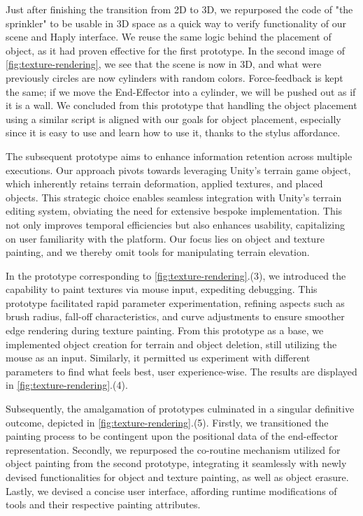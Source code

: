 Just after finishing the transition from 2D to 3D, we repurposed the code of "the sprinkler" to be usable in 3D space as a quick way to verify functionality of our scene and Haply interface.
We reuse the same logic behind the placement of object, as it had proven effective for the first prototype.
In the second image of \autoref{fig:texture-rendering}, we see that the scene is now in 3D, and what were previously circles are now cylinders with random colors.
Force-feedback is kept the same; if we move the End-Effector into a cylinder, we will be pushed out as if it is a wall.
We concluded from this prototype that handling the object placement using a similar script is aligned with our goals for object placement, especially since it is easy to use and learn how to use it, thanks to the stylus affordance. 

The subsequent prototype aims to enhance information retention across multiple executions. 
Our approach pivots towards leveraging Unity's terrain game object, which inherently retains terrain deformation, applied textures, and placed objects. 
This strategic choice enables seamless integration with Unity's terrain editing system, obviating the need for extensive bespoke implementation. 
This not only improves temporal efficiencies but also enhances usability, capitalizing on user familiarity with the platform. 
Our focus lies on object and texture painting, and we thereby omit tools for manipulating terrain elevation. 

In the prototype corresponding to \autoref{fig:texture-rendering}.(3), we introduced the capability to paint textures via mouse input, expediting debugging.
This prototype facilitated rapid parameter experimentation, refining aspects such as brush radius, fall-off characteristics, and curve adjustments to ensure smoother edge rendering during texture painting.
From this prototype as a base, we implemented object creation for terrain and object deletion, still utilizing the mouse as an input.
Similarly, it permitted us experiment with different parameters to find what feels best, user experience-wise. 
The results are displayed in \autoref{fig:texture-rendering}.(4).

Subsequently, the amalgamation of prototypes culminated in a singular definitive outcome, depicted in \autoref{fig:texture-rendering}.(5).
Firstly, we transitioned the painting process to be contingent upon the positional data of the end-effector representation. 
Secondly, we repurposed the co-routine mechanism utilized for object painting from the second prototype, integrating it seamlessly with newly devised functionalities for object and texture painting, as well as object erasure. 
Lastly, we devised a concise user interface, affording runtime modifications of tools and their respective painting attributes.

